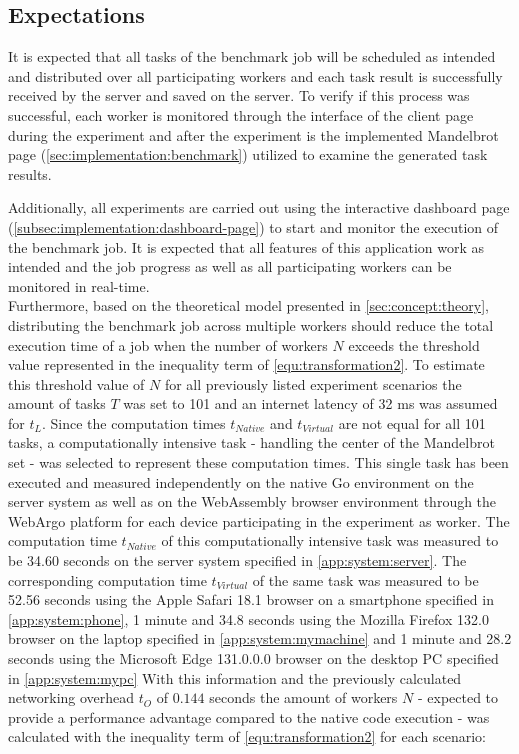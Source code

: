 \subsection{Expectations}
It is expected that all tasks of the benchmark job will be scheduled as intended and distributed over all participating workers and each task result is successfully received by the server and saved on the server. To verify if this process was successful, each worker is monitored through the interface of the client page during the experiment and after the experiment is the implemented Mandelbrot page (\autoref{sec:implementation:benchmark}) utilized to examine the generated task results.

Additionally, all experiments are carried out using the interactive dashboard page (\autoref{subsec:implementation:dashboard-page}) to start and monitor the execution of the benchmark job. It is expected that all features of this application work as intended and the job progress as well as all participating workers can be monitored in real-time.
~\\
Furthermore, based on the theoretical model presented in \autoref{sec:concept:theory}, distributing the benchmark job across multiple workers should reduce the total execution time of a job when the number of workers $N$ exceeds the threshold value represented in the inequality term of \eqref{equ:transformation2}. To estimate this threshold value of $N$ for all previously listed experiment scenarios the amount of tasks $T$ was set to 101 and an internet latency of 32 ms \cite{backend:latency} was assumed for $t_{L}$. Since the computation times $t_{Native}$ and $t_{Virtual}$ are not equal for all 101 tasks, a computationally intensive task - handling the center of the Mandelbrot set - was selected to represent these computation times. This single task has been executed and measured independently on the native Go environment on the server system as well as on the WebAssembly browser environment through the WebArgo platform for each device participating in the experiment as worker. The computation time $t_{Native}$ of this computationally intensive task was measured to be 34.60 seconds on the server system specified in \autoref{app:system:server}. The corresponding computation time $t_{Virtual}$ of the same task was measured to be 52.56 seconds using the Apple Safari 18.1 \cite{evaluation:safari} browser on a smartphone specified in \autoref{app:system:phone}, 1 minute and 34.8 seconds using the Mozilla Firefox 132.0 \cite{background:firefox} browser on the laptop specified in \autoref{app:system:mymachine} and 1 minute and 28.2 seconds using the Microsoft Edge 131.0.0.0 \cite{evaluation:edge} browser on the desktop \ac{PC} specified in \autoref{app:system:mypc} With this information and the previously calculated networking overhead $t_{O}$ of $0.144$ seconds the amount of workers $N$ - expected to provide a performance advantage compared to the native code execution - was calculated with the inequality term of \eqref{equ:transformation2} for each scenario:
